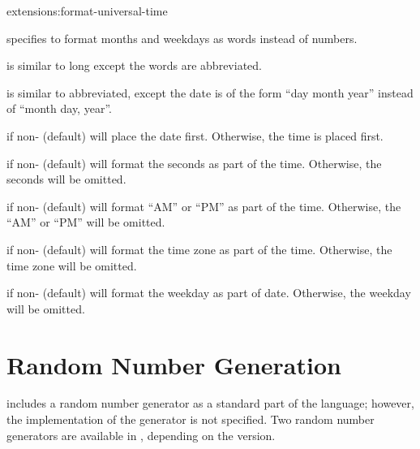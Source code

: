 \begin{defun}{extensions:}{format-universal-time}
\begin{Lentry}
\begin{Lentry}
     \item[\kwd{long}] specifies to format months and weekdays as
       words instead of numbers.
  
     \item[\kwd{abbreviated}] is similar to long except the words are
       abbreviated.
  
     \item[\kwd{government}] is similar to abbreviated, except the
       date is of the form ``day month year'' instead of ``month day,
       year''.
     \end{Lentry}
     
   \item[\kwd{date-first}] if non-\false{} (default) will place the
     date first.  Otherwise, the time is placed first.
  
   \item[\kwd{print-seconds}] if non-\false{} (default) will format
     the seconds as part of the time.  Otherwise, the seconds will be
     omitted.
  
   \item[\kwd{print-meridian}] if non-\false{} (default) will format
     ``AM'' or ``PM'' as part of the time.  Otherwise, the ``AM'' or
     ``PM'' will be omitted.
  
   \item[\kwd{print-timezone}] if non-\false{} (default) will format
     the time zone as part of the time.  Otherwise, the time zone will
     be omitted.

  
   \item[\kwd{print-weekday}] if non-\false{} (default) will format
     the weekday as part of date.  Otherwise, the weekday will be
     omitted.
   \end{Lentry}
\end{defun}


\section{Random Number Generation}

\clisp{} includes a random number generator as a standard part of the
language; however, the implementation of the generator is not
specified.  Two random number generators are available in \cmucl{},
depending on the version.

